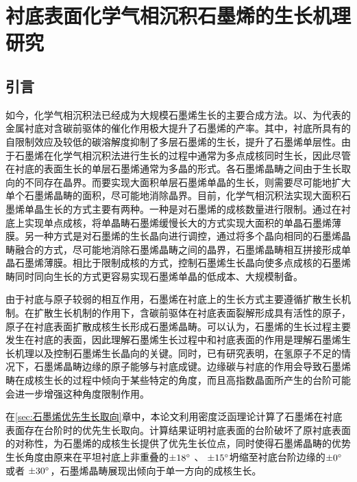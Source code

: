 \def\CCluster#1{\rm{C_{#1}}}
\chapter{衬底表面化学气相沉积石墨烯的生长机理研究}
\label{cap:石墨烯的生长机理研究}
\section{引言}
如今，化学气相沉积法已经成为大规模石墨烯生长的主要合成方法。以、为代表的金属衬底对含碳前驱体的催化作用极大提升了石墨烯的产率。其中，衬底所具有的自限制效应及较低的碳溶解度抑制了多层石墨烯的生长，提升了石墨烯单层性。由于石墨烯在化学气相沉积法进行生长的过程中通常为多点成核同时生长，因此尽管在衬底的表面生长的单层石墨烯通常为多晶的形式。各石墨烯晶畴之间由于生长取向的不同存在晶界。而要实现大面积单层石墨烯单晶的生长，则需要尽可能地扩大单个石墨烯晶畴的面积，尽可能地消除晶界。目前，化学气相沉积法实现大面积石墨烯单晶生长的方式主要有两种。一种是对石墨烯的成核数量进行限制。通过在衬底上实现单点成核，将单晶畴石墨烯缓慢长大的方式实现大面积的单晶石墨烯薄膜。另一种方式是对石墨烯的生长晶向进行调控，通过将多个晶向相同的石墨烯晶畴融合的方式，尽可能地消除石墨烯晶畴之间的晶界，石墨烯晶畴相互拼接形成单晶石墨烯薄膜。相比于限制成核的方式，控制石墨烯生长晶向使多点成核的石墨烯畴同时同向生长的方式更容易实现石墨烯单晶的低成本、大规模制备。

由于衬底与原子较弱的相互作用，石墨烯在衬底上的生长方式主要遵循扩散生长机制。在扩散生长机制的作用下，含碳前驱体在衬底表面裂解形成具有活性的原子，原子在衬底表面扩散成核生长形成石墨烯晶畴。可以认为，石墨烯的生长过程主要发生在衬底的表面，因此理解石墨烯生长过程中和衬底表面的作用是理解石墨烯生长机理以及控制石墨烯生长晶向的关键。同时，已有研究表明，在氢原子不足的情况下，石墨烯晶畴边缘的原子能够与衬底成键。边缘碳与衬底的作用会导致石墨烯畴在成核生长的过程中倾向于某些特定的角度，而且高指数晶面所产生的台阶可能会进一步增强这种角度限制作用。

在\ref{sec:石墨烯优先生长取向}章中，本论文利用密度泛函理论计算了石墨烯在衬底表面存在台阶时的优先生长取向。计算结果证明衬底表面的台阶破坏了原衬底表面的对称性，为石墨烯的成核生长提供了优先生长位点，同时使得石墨烯晶畴的优势生长角度由原来在平坦衬底上非重叠的$\SI{\pm 18}{\degree}$ 、 $\SI{\pm 15}{\degree}$坍缩至衬底台阶边缘的$\SI{\pm 0}{\degree}$ 或者 $\SI{\pm 30}{\degree}$，石墨烯晶畴展现出倾向于单一方向的成核生长。

